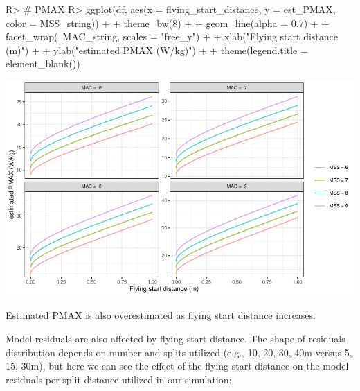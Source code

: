 \documentclass[
]{jss}
\begin{document}
\begin{CodeChunk}
\begin{CodeInput}
R> # PMAX
R> ggplot(df, aes(x = flying_start_distance, y = est_PMAX, color = MSS_string)) +
+   theme_bw(8) +
+   geom_line(alpha = 0.7) +
+   facet_wrap(~MAC_string, scales = "free_y") +
+   xlab("Flying start distance (m)") +
+   ylab("estimated PMAX (W/kg)") +
+   theme(legend.title = element_blank())
\end{CodeInput}


\begin{center}\includegraphics[width=1\linewidth]{paper_files/figure-latex/unnamed-chunk-29-1} \end{center}

\end{CodeChunk}

Estimated PMAX is also overestimated as flying start distance increases.

Model residuals are also affected by flying start distance. The shape of residuals distribution depends on number and splits utilized (e.g., 10, 20, 30, 40m versus 5, 15, 30m), but here we can see the effect of the flying start distance on the model residuals per split distance utilized in our simulation:
\end{document}
